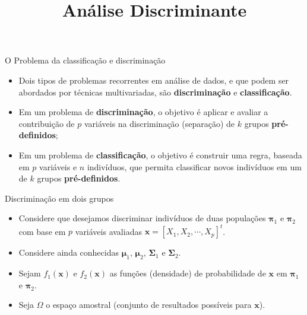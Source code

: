 \documentclass[
  ignorenonframetext,
  aspectratio=169,
]{beamer}
\title{Análise Discriminante}
\author{}
\date{}
\providecommand{\tightlist}{%
  \setlength{\itemsep}{0pt}\setlength{\parskip}{0pt}}
\begin{document}
\frame{\titlepage}


\begin{frame}{O Problema da classificação e discriminação}
\label{o-problema-da-classificauxe7uxe3o-e-discriminauxe7uxe3o}
\begin{itemize}
\tightlist
\item
  Dois tipos de problemas recorrentes em análise de dados, e que podem
  ser abordados por técnicas multivariadas, são \textbf{discriminação} e
  \textbf{classificação}.
\end{itemize}

\pause

\begin{itemize}
\tightlist
\item
  Em um problema de \textbf{discriminação}, o objetivo é aplicar e
  avaliar a contribuição de \(p\) variáveis na discriminação (separação)
  de \(k\) grupos \textbf{pré-definidos};
\end{itemize}

\pause

\begin{itemize}
\tightlist
\item
  Em um problema de \textbf{classificação}, o objetivo é construir uma
  regra, baseada em \(p\) variáveis e \(n\) indivíduos, que permita
  classificar novos indivíduos em um de \(k\) grupos
  \textbf{pré-definidos}.
\end{itemize}
\end{frame}

\begin{frame}{Discriminação em dois grupos}
\label{discriminauxe7uxe3o-em-dois-grupos}
\begin{itemize}
\tightlist
\item
  Considere que desejamos discriminar indivíduos de duas populações
  \(\boldsymbol{\pi}_1\) e \(\boldsymbol{\pi}_2\) com base em \(p\)
  variáveis avaliadas \(\boldsymbol{x} = [X_1, X_2, \cdots, X_p]^t\).
\end{itemize}

\pause

\begin{itemize}
\tightlist
\item
  Considere ainda conhecidas \(\boldsymbol{\mu}_1\),
  \(\boldsymbol{\mu}_2\), \(\boldsymbol{\Sigma}_1\) e
  \(\boldsymbol{\Sigma}_2\).
\end{itemize}

\pause

\begin{itemize}
\tightlist
\item
  Sejam \(f_1(\boldsymbol{x})\) e \(f_2(\boldsymbol{x})\) as funções
  (densidade) de probabilidade de \(\boldsymbol{x}\) em
  \(\boldsymbol{\pi}_1\) e \(\boldsymbol{\pi}_2\).
\end{itemize}

\pause

\begin{itemize}
\tightlist
\item
  Seja \(\Omega\) o espaço amostral (conjunto de resultados possíveis
  para \(\boldsymbol{x}\)).
\end{itemize}
\end{frame}
\end{document}

